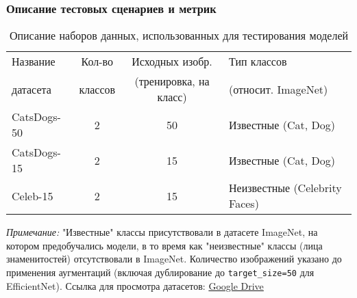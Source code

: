 \documentclass[14pt]{extarticle}
\begin{document}
\subsubsection{Описание тестовых сценариев и метрик}
\vspace{-5pt}
\begin{table}[htbp]
\centering
\caption{Описание наборов данных, использованных для тестирования моделей}
\vspace{5pt}
\label{tab:datasets_description}
\begin{tabularx}{\textwidth}{l c c X}
\toprule
Название & Кол-во & Исходных изобр. & Тип классов \\ 
датасета  & классов & (тренировка, на класс) & (относит. ImageNet) \\
\midrule
CatsDogs-50       & 2       & 50                     & Известные (Cat, Dog) \\
CatsDogs-15       & 2       & 15                     & Известные (Cat, Dog) \\
Celeb-15          & 2       & 15                     & Неизвестные (Celebrity Faces) \\
\bottomrule
\end{tabularx} 
\par\medskip
\footnotesize{
\textit{Примечание:} "Известные" классы присутствовали в датасете ImageNet, на котором предобучались модели, в то время как "неизвестные" классы (лица знаменитостей) отсутствовали в ImageNet. Количество изображений указано до применения аугментаций (включая дублирование до \texttt{target\_size=50} для EfficientNet).
Ссылка для просмотра датасетов: \href{https://drive.google.com/drive/folders/15sB_uKL3jGbAPhytC0EaE44mOfEbUL0C?usp=sharing}{Google Drive}
}
\end{table}
\vspace{\baselineskip}
\end{document}
